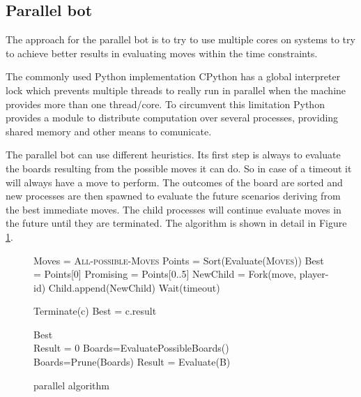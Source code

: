 \subsection{Parallel bot}
\label{parallel}

The approach for the parallel bot is to try to use multiple cores on systems to
try to achieve better results in evaluating moves within the time constraints.

The commonly used Python implementation CPython has a global interpreter lock
which prevents multiple threads to really run in parallel when the machine
provides more than one thread/core\cite{pygil}. To circumvent this limitation
Python provides a module to distribute computation over several processes,
providing shared memory and other means to comunicate.

The parallel bot can use different heuristics. Its first step is always to
evaluate the boards resulting from the possible moves it can do. So in case of a
timeout it will always have a move to perform.
The outcomes of the board are sorted and new processes are then spawned to
evaluate the future scenarios deriving from the best immediate moves.
The child processes will continue evaluate moves in the future until they are
terminated.
The algorithm is shown in detail in Figure \ref{parallel_algorithm}.

\begin{figure}
\begin{algorithmic}
    \State Moves = \textsc{All-possible-Moves}
    \State Points = Sort(Evaluate(\textsc{Moves}))
    \State Best = Points[0]
    \State Promising = Points[0..5]
        \State NewChild = Fork(move, player-id)
        \State Child.append(NewChild)
    \EndFor
    \State Wait(timeout)

        \State Terminate(c)
            \State Best = c.result
        \EndIf
    \EndFor

    \State \Return Best
\EndFunction
\\
    \State Result = 0
            \State Boards=EvaluatePossibleBoards()
            \State Boards=Prune(Boards)
                    \State Result = Evaluate(B)
                \EndIf
            \EndFor
        \EndFor
    \EndWhile
\EndFunction

\end{algorithmic}
\caption{parallel algorithm}
\label{parallel_algorithm}
\end{figure}
